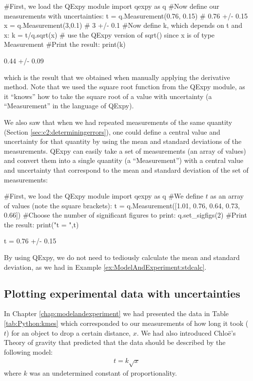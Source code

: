 \begin{python}[caption=QExpy to propagate uncertainties] 
#First, we load the QExpy module
import qexpy as q
#Now define our measurements with uncertainties:
t = q.Measurement(0.76, 0.15) # 0.76 +/- 0.15
x = q.Measurement(3,0.1) # 3 +/- 0.1
#Now define k, which depends on t and x:
k = t/q.sqrt(x) # use the QExpy version of sqrt() since x is of type Measurement
#Print the result:
print(k)
\end{python}
\begin{poutput}
0.44 +/- 0.09
\end{poutput}
which is the result that we obtained when manually applying the derivative method. Note that we used the square root function from the QExpy module, as it ``knows'' how to take the square root of a value with uncertainty (a ``Measurement'' in the language of QExpy). 

We also saw that when we had repeated measurements of the same quantity (Section \ref{sec:c2:determiningerrors}), one could define a central value and uncertainty for that quantity by using the mean and standard deviations of the measurements. QExpy can easily take a set of measurements (an array of values) and convert them into a single quantity (a ``Measurement'') with a central value and uncertainty that correspond to the mean and standard deviation of the set of measurements:

\begin{python}[caption=QExpy to calculate mean and standard deviation] 
#First, we load the QExpy module
import qexpy as q
#We define $t$ as an array of values (note the square brackets):
t = q.Measurement([1.01,  0.76,  0.64,  0.73,  0.66])
#Choose the number of significant figures to print:
q.set_sigfigs(2)
#Print the result:
print("t = ",t)
\end{python}
\begin{poutput}
t = 0.76 +/- 0.15
\end{poutput}
By using QExpy, we do not need to tediously calculate the mean and standard deviation, as we had in Example \ref{ex:ModelAndExperiment:stdcalc}.


\subsection{Plotting experimental data with uncertainties}
In Chapter \ref{chap:modelandexperiment} we had presented the data in Table \ref{tab:Python:kmes} which corresponded to our measurements of how long it took ($t$) for an object to drop a certain distance, $x$. We had also introduced  Chlo\"e's Theory of gravity that predicted that the data should be described by the following model:
\begin{align*}
t = k \sqrt{x}
\end{align*}
where $k$ was an undetermined constant of proportionality.

